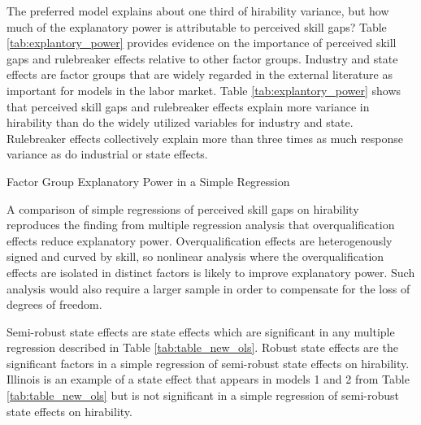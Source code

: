 \documentclass[review]{elsarticle}
\begin{document}
The preferred model explains about one third of hirability variance, but how much of the explanatory power is attributable to perceived skill gaps?
Table \ref{tab:explantory_power} provides evidence on the importance of perceived skill gaps and rulebreaker effects relative to other factor groups.
Industry and state effects are factor groups that are widely regarded in the external literature as important for models in the labor market.
Table \ref{tab:explantory_power} shows that perceived skill gaps and rulebreaker effects explain more variance in hirability than do the widely utilized variables for industry and state.
Rulebreaker effects collectively explain more than three times as much response variance as do industrial or state effects.

\begin{table}
    \caption{Factor Group Explanatory Power in a Simple Regression}
    \resizebox{\columnwidth}{!}{
        
    }
    \label{tab:explantory_power}
\end{table}

A comparison of simple regressions of perceived skill gaps on hirability reproduces the finding from multiple regression analysis that overqualification effects reduce explanatory power.
Overqualification effects are heterogenously signed and curved by skill, so nonlinear analysis where the overqualification effects are isolated in distinct factors is likely to improve explanatory power.
Such analysis would also require a larger sample in order to compensate for the loss of degrees of freedom.

Semi-robust state effects are state effects which are significant in any multiple regression described in Table \ref{tab:table_new_ols}.
Robust state effects are the significant factors in a simple regression of semi-robust state effects on hirability.
Illinois is an example of a state effect that appears in models 1 and 2 from Table \ref{tab:table_new_ols} but is not significant in a simple regression of semi-robust state effects on hirability.
\end{document}
